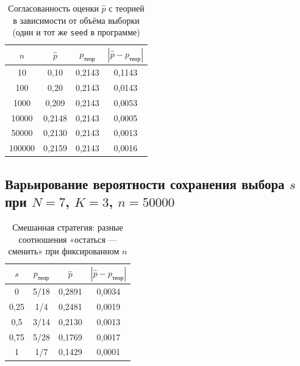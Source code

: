 \documentclass[a4paper, 14pt]{extarticle}
\begin{document}
\begin{table}[H]
\centering
\begin{tabular}{|c|c|c|c|}
\hline
$n$ & $\hat p$ & $p_{\text{теор}}$ & $| \hat p - p_{\text{теор}} |$ \\
\hline
10 & 0{,}10 & 0{,}2143 & 0{,}1143 \\
100 & 0{,}20 & 0{,}2143 & 0{,}0143 \\
1000 & 0{,}209 & 0{,}2143 & 0{,}0053 \\
10000 & 0{,}2148 & 0{,}2143 & 0{,}0005 \\
50000 & 0{,}2130 & 0{,}2143 & 0{,}0013 \\
100000 & 0{,}2159 & 0{,}2143 & 0{,}0016 \\
\hline
\end{tabular}
\caption{Согласованность оценки $\hat p$ с теорией в зависимости от объёма выборки (один и тот же \texttt{seed} в программе)}
\label{tab:sweep_n}
\end{table}

\subsection{Варьирование вероятности сохранения выбора $s$ при $N=7$, $K=3$, $n=50000$}
\begin{table}[H]
\centering
\begin{tabular}{|c|c|c|c|}
\hline
$s$ & $p_{\text{теор}}$ & $\hat p$ & $| \hat p - p_{\text{теор}} |$ \\
\hline
0 & 5/18 & 0{,}2891 & 0{,}0034 \\
0{,}25 & 1/4 & 0{,}2481 & 0{,}0019 \\
0{,}5 & 3/14 & 0{,}2130 & 0{,}0013 \\
0{,}75 & 5/28 & 0{,}1769 & 0{,}0017 \\
1 & 1/7 & 0{,}1429 & 0{,}0001 \\
\hline
\end{tabular}
\caption{Смешанная стратегия: разные соотношения «остаться --- сменить» при фиксированном $n$}
\label{tab:sweep_s}
\end{table}
\end{document}
